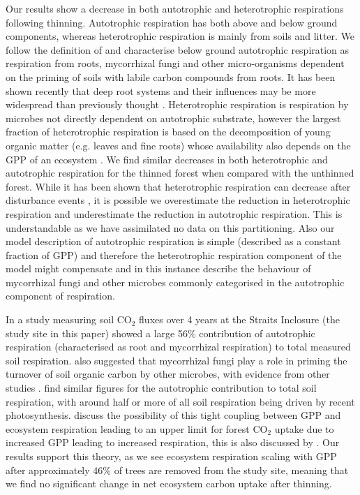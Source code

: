 \documentclass[draft,linenumbers]{agujournal}
\begin{document}
Our results show a decrease in both autotrophic and heterotrophic respirations following thinning. Autotrophic respiration has both above and below ground components, whereas heterotrophic respiration is mainly from soils and litter. We follow the definition of \citet{heinemeyer2012exploring} and characterise below ground autotrophic respiration as respiration from roots, mycorrhizal fungi and other micro-organisms dependent on the priming of soils with labile carbon compounds from roots. It has been shown recently that deep root systems and their influences may be more widespread than previously thought \citep{Pierret01102016}. Heterotrophic respiration is respiration by microbes not directly dependent on autotrophic substrate, however the largest fraction of heterotrophic respiration is based on the decomposition of young organic matter (e.g. leaves and fine roots) whose availability also depends on the GPP of an ecosystem \citep{GCB:GCB412}. We find similar decreases in both heterotrophic and autotrophic respiration for the thinned forest when compared with the unthinned forest. While it has been shown that heterotrophic respiration can decrease after disturbance events \citep{PCE:PCE1053}, it is possible we overestimate the reduction in heterotrophic respiration and underestimate the reduction in autotrophic respiration. This is understandable as we have assimilated no data on this partitioning. Also our model description of autotrophic respiration is simple (described as a constant fraction of GPP) and therefore the heterotrophic respiration component of the model might compensate and in this instance describe the behaviour of mycorrhizal fungi and other microbes commonly categorised in the autotrophic component of respiration.   

In a study measuring soil CO\(_{2}\) fluxes over 4 years at the Straits Inclosure (the study site in this paper) \citet{heinemeyer2012exploring} showed a large 56\% contribution of autotrophic respiration (characterised as root and mycorrhizal respiration) to total measured soil respiration. \citet{heinemeyer2012exploring} also suggested that mycorrhizal fungi play a role in priming the turnover of soil organic carbon by other microbes, with evidence from other studies \citep{talbot2008decomposers}. \citet{hogberg2006towards} find similar figures for the autotrophic contribution to total soil respiration, with around half or more of all soil respiration being driven by recent photosynthesis. \citet{heinemeyer2012exploring} discuss the possibility of this tight coupling between GPP and ecosystem respiration leading to an upper limit for forest CO\(_{2}\) uptake due to increased GPP leading to increased respiration, this is also discussed by \citet{heath2005rising}. Our results support this theory, as we see ecosystem respiration scaling with GPP after approximately 46\% of trees are removed from the study site, meaning that we find no significant change in net ecosystem carbon uptake after thinning.   
\end{document}
